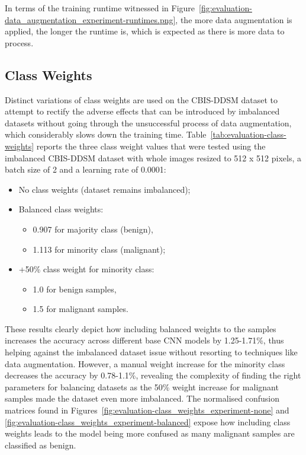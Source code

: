 In terms of the training runtime witnessed in Figure~\ref{fig:evaluation-data_augmentation_experiment-runtimes.png}, the more data augmentation is applied, the longer the runtime is, which is expected as there is more data to process.


\subsection{Class Weights}

Distinct variations of class weights are used on the CBIS-DDSM dataset to attempt to rectify the adverse effects that can be introduced by imbalanced datasets without going through the unsuccessful process of data augmentation, which considerably slows down the training time. Table~\ref{tab:evaluation-class-weights} reports the three class weight values that were tested using the imbalanced CBIS-DDSM dataset with whole images resized to 512 x 512 pixels, a batch size of 2 and a learning rate of 0.0001:
\begin{itemize}
    \item No class weights (dataset remains imbalanced);
    \item Balanced class weights:
    \begin{itemize}
        \item 0.907 for majority class (benign),
        \item 1.113 for minority class (malignant);
    \end{itemize}
    \item +50\% class weight for minority class:
    \begin{itemize}
        \item 1.0 for benign samples,
        \item 1.5 for malignant samples.
    \end{itemize}
\end{itemize}



These results clearly depict how including balanced weights to the samples increases the accuracy across different base CNN models by 1.25-1.71\%, thus helping against the imbalanced dataset issue without resorting to techniques like data augmentation. However, a manual weight increase for the minority class decreases the accuracy by 0.78-1.1\%, revealing the complexity of finding the right parameters for balancing datasets as the 50\% weight increase for malignant samples made the dataset even more imbalanced. The normalised confusion matrices found in Figures~\ref{fig:evaluation-class_weights_experiment-none} and \ref{fig:evaluation-class_weights_experiment-balanced} expose how including class weights leads to the model being more confused as many malignant samples are classified as benign.

